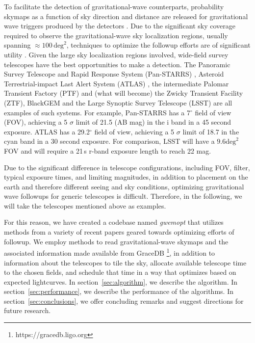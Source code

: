 \documentclass[twocolumn]{aastex61}
\begin{document}
To facilitate the detection of gravitational-wave counterparts, probability skymaps as a function of sky direction and distance are released for gravitational wave triggers produced by the detectors \citep{SiPr2014,BeMa2015}. 
Due to the significant sky coverage required to observe the gravitational-wave sky localization regions, usually spanning $\approx 100\,\textrm{deg}^2$, techniques to optimize the followup efforts are of significant utility \citep{Fair2009,Fair2011,Grover:2013,WeCh2010,SiAy2014,SiPr2014,BeMa2015,EsVi2015,CoLi2015,KlVe2016}.
Given the large sky localization regions involved, wide-field survey telescopes have the best opportunities to make a detection. 
The Panoramic Survey Telescope and Rapid Response System (Pan-STARRS) \cite{MoKa2012}, Asteroid Terrestrial-impact Last Alert System (ATLAS) \cite{Ton2011}, the intermediate Palomar Transient Factory (PTF) \cite{RaSh2009} and (what will become) the Zwicky Transient Facility (ZTF), BlackGEM \cite{BlGr2015} and the Large Synoptic Survey Telescope (LSST) \cite{Ivezic2014} are all examples of such systems.
For example, Pan-STARRS has a 7$^\circ$ field of view (FOV), achieving a 5 $\sigma$ limit of 21.5 (AB mag) in the i band in a 45 second exposure. ATLAS has a 29.2$^\circ$ field of view, achieving a 5 $\sigma$ limit of 18.7 in the cyan band in a 30 second exposure. For comparison, LSST will have a $9.6\textrm{deg}^2$ FOV and will require a 21\,s r-band exposure length to reach 22 mag.

Due to the significant difference in telescope configurations, including FOV, filter, typical exposure times, and limiting magnitudes, in addition to placement on the earth and therefore different seeing and sky conditions, optimizing gravitational wave followups for generic telescopes is difficult. Therefore, in the following, we will take the telescopes mentioned above as examples. 

For this reason, we have created a codebase named \emph{gwemopt} that utilizes methods from a variety of recent papers geared towards optimizing efforts of followup. We employ methods to read gravitational-wave skymaps and the associated information made available from GraceDB \footnote{https://gracedb.ligo.org}, in addition to information about the telescopes to tile the sky, allocate available telescope time to the chosen fields, and schedule that time in a way that optimizes based on expected lightcurves.
In section~\ref{sec:algorithm}, we describe the algorithm.
In section~\ref{sec:performance}, we describe the performance of the algorithms.
In section~\ref{sec:conclusions}, we offer concluding remarks and suggest directions for future research.
\end{document}
